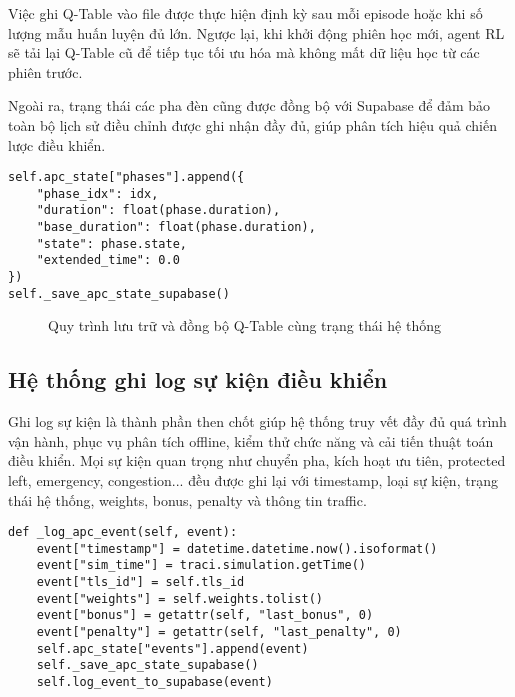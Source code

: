 Việc ghi Q-Table vào file được thực hiện định kỳ sau mỗi episode hoặc khi số lượng mẫu huấn luyện đủ lớn. Ngược lại, khi khởi động phiên học mới, agent RL sẽ tải lại Q-Table cũ để tiếp tục tối ưu hóa mà không mất dữ liệu học từ các phiên trước.

Ngoài ra, trạng thái các pha đèn cũng được đồng bộ với Supabase để đảm bảo toàn bộ lịch sử điều chỉnh được ghi nhận đầy đủ, giúp phân tích hiệu quả chiến lược điều khiển.

\begin{lstlisting}[style=py,caption={Đồng bộ trạng thái pha với Supabase}]
self.apc_state["phases"].append({
    "phase_idx": idx,
    "duration": float(phase.duration),
    "base_duration": float(phase.duration),
    "state": phase.state,
    "extended_time": 0.0
})
self._save_apc_state_supabase()
\end{lstlisting}

\begin{figure}[H]
    \centering
    \caption{Quy trình lưu trữ và đồng bộ Q-Table cùng trạng thái hệ thống}
\end{figure}
\subsection{Hệ thống ghi log sự kiện điều khiển}

Ghi log sự kiện là thành phần then chốt giúp hệ thống truy vết đầy đủ quá trình vận hành, phục vụ phân tích offline, kiểm thử chức năng và cải tiến thuật toán điều khiển. Mọi sự kiện quan trọng như chuyển pha, kích hoạt ưu tiên, protected left, emergency, congestion... đều được ghi lại với timestamp, loại sự kiện, trạng thái hệ thống, weights, bonus, penalty và thông tin traffic.

\begin{lstlisting}[style=py,caption={Ghi log sự kiện lên Supabase}]
def _log_apc_event(self, event):
    event["timestamp"] = datetime.datetime.now().isoformat()
    event["sim_time"] = traci.simulation.getTime()
    event["tls_id"] = self.tls_id
    event["weights"] = self.weights.tolist()
    event["bonus"] = getattr(self, "last_bonus", 0)
    event["penalty"] = getattr(self, "last_penalty", 0)
    self.apc_state["events"].append(event)
    self._save_apc_state_supabase()
    self.log_event_to_supabase(event)
\end{lstlisting}

